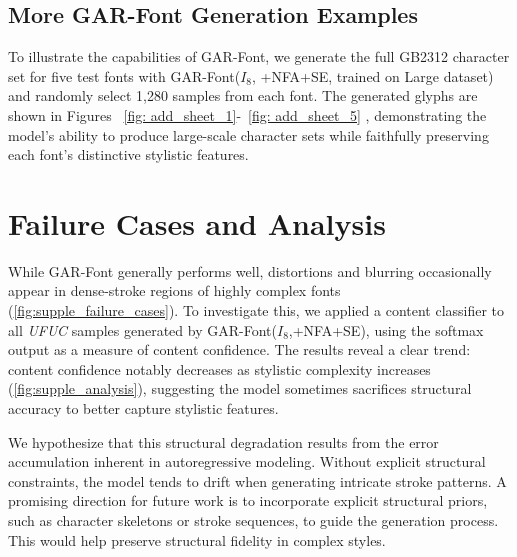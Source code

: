 \subsection{More GAR-Font Generation Examples}
To illustrate the capabilities of GAR-Font, we generate the full GB2312 character set for five test fonts with GAR-Font($I_8$, +NFA+SE, trained on Large dataset) and randomly select 1,280 samples from each font. The generated glyphs are shown in Figures ~\ref{fig: add_sheet_1}-~\ref{fig: add_sheet_5} , demonstrating the model’s ability to produce large-scale character sets while faithfully preserving each font’s distinctive stylistic features.


\section{Failure Cases and Analysis}
\label{sec:Failure_cases}

While GAR-Font generally performs well, distortions and blurring occasionally appear in dense-stroke regions of highly complex fonts (\cref{fig:supple_failure_cases}). To investigate this, we applied a content classifier to all \textit{UFUC} samples generated by GAR-Font($I_8$,+NFA+SE), using the softmax output as a measure of content confidence. The results reveal a clear trend: content confidence notably decreases as stylistic complexity increases (\cref{fig:supple_analysis}), suggesting the model sometimes sacrifices structural accuracy to better capture stylistic features.

We hypothesize that this structural degradation results from the error accumulation inherent in autoregressive modeling. Without explicit structural constraints, the model tends to drift when generating intricate stroke patterns. A promising direction for future work is to incorporate explicit structural priors, such as character skeletons or stroke sequences, to guide the generation process. This would help preserve structural fidelity in complex styles.


